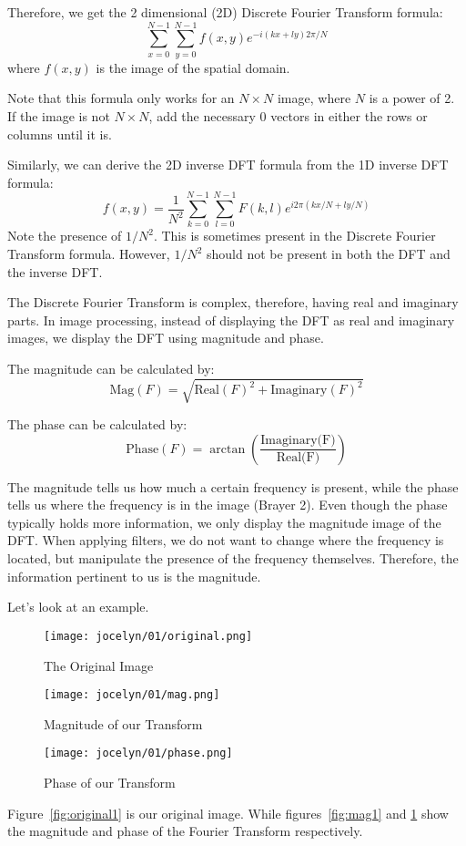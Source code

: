 \documentclass [../article.tex]{subfiles}
\begin{document}
  Therefore, we get the 2 dimensional (2D) Discrete Fourier
  Transform formula:
  \[\sum_{x=0}^{N-1}\sum_{y=0}^{N-1}f(x,y)e^{-i(kx+ly)2\pi/N}\]
  where $f(x,y)$ is the image of the spatial domain.

  Note that this formula only works for an $N \times N$ image,
  where $N$ is a power of 2. If the image is not $N \times N$,
  add the necessary 0 vectors in either the rows or columns
  until it is.

  Similarly, we can derive the 2D inverse DFT formula from the
  1D inverse DFT formula:
  \[f(x,y) = \frac{1}{N^2}\sum_{k=0}^{N-1}\sum_{l=0}^{N-1}
    F(k,l)e^{i2\pi(kx/N+ly/N)}\]
  Note the presence of $1/N^2$. This is sometimes present
  in the Discrete Fourier Transform formula. However,
  $1/N^2$ should not be present in both the DFT and the
  inverse DFT.

  The Discrete Fourier Transform is complex, therefore, having
  real and imaginary parts.  In image processing, instead of
  displaying the DFT as real and imaginary images, we display
  the DFT using magnitude and phase.

  The magnitude can be calculated by:
  \[\text{Mag}(F) = \sqrt{\text{Real}(F)^2 + \text{Imaginary}(F)^2}\]

  The phase can be calculated by:
  \[\text{Phase}(F) = \arctan\left(
  \frac{\text{Imaginary(F)}}{\text{Real(F)}}\right)\]

  The magnitude tells us how much a certain frequency is present,
  while the phase tells us where the frequency is in the image
  (Brayer 2).  Even though the phase typically holds more
  information, we only display the magnitude image of the DFT.
  When applying filters, we do not want to change where the
  frequency is located, but manipulate the presence of the
  frequency themselves.  Therefore, the information pertinent
  to us is the magnitude.

  Let's look at an example.
  \begin{figure}[!htb]
    \texttt{[image: jocelyn/01/original.png]}
    \caption{The Original Image}
    \label{fig:original1}
  \endminipage\hfill
    \texttt{[image: jocelyn/01/mag.png]}
    \caption{Magnitude of our Transform}
    \label{fig:mag1}
  \endminipage\hfill
    \texttt{[image: jocelyn/01/phase.png]}
    \caption{Phase of our Transform}
    \label{fig:phase1}
  \endminipage
  \end{figure}
  Figure~\ref{fig:original1} is our original image. While
  figures~\ref{fig:mag1} and \ref{fig:phase1} show the
  magnitude and phase of the Fourier Transform respectively.
\end{document}
